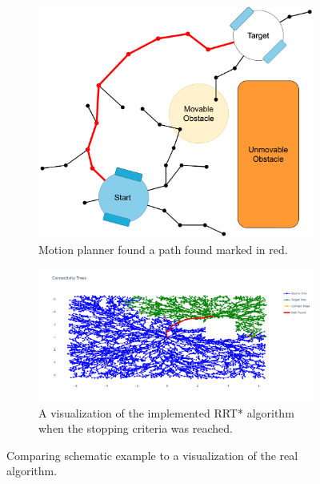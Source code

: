 \begin{figure}[H]
    \centering
    \begin{subfigure}{0.5\textwidth}
    \centering
    \includegraphics[width=1.10\textwidth]{figures/mp/7mp_path_found.drawio.png}
    \caption{Motion planner found a path found marked in red.}
    \end{subfigure}%

    \begin{subfigure}{\textwidth}
    \hspace{-0.7cm}
    \includegraphics[width=1.1\textwidth]{figures/mp/mp_the_real_deal.png}
    \caption{A visualization of the implemented \acs{RRT*} algorithm\\when the stopping criteria was reached.}
    \end{subfigure}
    \label{fig:motion_planner_comparison}%
    \caption{Comparing schematic example to a visualization of the real algorithm.}
\end{figure}

